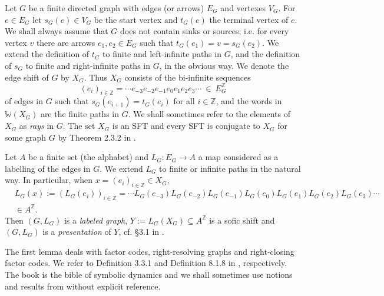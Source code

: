 \documentclass[12pt,oneside,english]{amsart}
\begin{document}
 
 Let $G$ be a finite directed graph with edges (or arrows) $E_G$ and vertexes $V_G$. For $e \in E_G$ let $s_G(e) \in V_G$ be the start vertex and $t_G(e)$ the terminal vertex of $e$. We shall always assume that $G$ does not contain sinks or sources; i.e. for every vertex $v$ there are arrows $e_1,e_2 \in E_G$ such that $t_G(e_1) = v = s_G(e_2)$. We extend the definition of $t_G$ to finite and left-infinite paths in $G$, and the definition of $s_G$ to finite and right-infinite paths in $G$, in the obvious way. We denote the edge shift of $G$ by $X_G$. Thus $X_G$ consists of the bi-infinite sequences 
 $$
 (e_i)_{i \in \mathbb Z} = \cdots e_{-3}e_{-2}e_{-1}e_0e_1e_2e_3 \cdots \ \in \ E_G^\mathbb Z
 $$ 
 of edges in $G$ such that $s_G(e_{i+1}) = t_G(e_i)$ for all $i \in \mathbb Z$, and the words in $\mathbb W(X_G)$ are the finite paths in $G$. We shall sometimes refer to the elements of $X_G$ as  \emph{rays} in $G$. The set $X_G$ is an SFT and every SFT is conjugate to $X_G$ for some graph $G$ by Theorem 2.3.2 in \cite{LM}.
 
Let $A$ be a finite set (the alphabet) and $L_G : E_G \to A$ a map considered as a labelling of the edges in $G$. We extend $L_G$ to finite or infinite paths in the natural way. In particular, when $x=(e_i)_{i \in \mathbb Z} \in X_G$,
\begin{align*}
&L_G(x) := \left(L_G(e_i)\right)_{i \in \mathbb Z} = \cdots L_G(e_{-3}) L_G(e_{-2}) L_G(e_{-1}) L_G(e_0)L_G(e_1)L_G(e_2) L_G(e_3) \cdots \\
&\in A^\mathbb Z .
\end{align*}
Then $(G,L_G)$ is a \emph{labeled graph}, $Y:= L_G(X_G) \subseteq A^\mathbb Z$ is a sofic shift and $(G,L_G)$ is a \emph{presentation} of $Y$, cf. \S 3.1 in \cite{LM}.
 
The first lemma deals with factor codes, right-resolving graphs and right-closing factor codes. We refer to Definition 3.3.1 and Definition 8.1.8 in \cite{LM}, respectively. The book \cite{LM} is the bible of symbolic dynamics and we shall sometimes use notions and results from \cite{LM} without explicit reference. 
\end{document}
